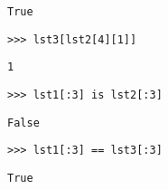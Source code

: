 \begin{solution}[.2in]
\begin{lstlisting}
True
\end{lstlisting}
\end{solution}

\begin{lstlisting}
>>> lst3[lst2[4][1]]
\end{lstlisting}

\begin{solution}[.2in]
\begin{lstlisting}
1
\end{lstlisting}
\end{solution}

\begin{lstlisting}
>>> lst1[:3] is lst2[:3]
\end{lstlisting}

\begin{solution}[.2in]
\begin{lstlisting}
False
\end{lstlisting}
\end{solution}

\begin{lstlisting}
>>> lst1[:3] == lst3[:3]
\end{lstlisting}

\begin{solution}[.2in]
\begin{lstlisting}
True
\end{lstlisting}
\end{solution}
